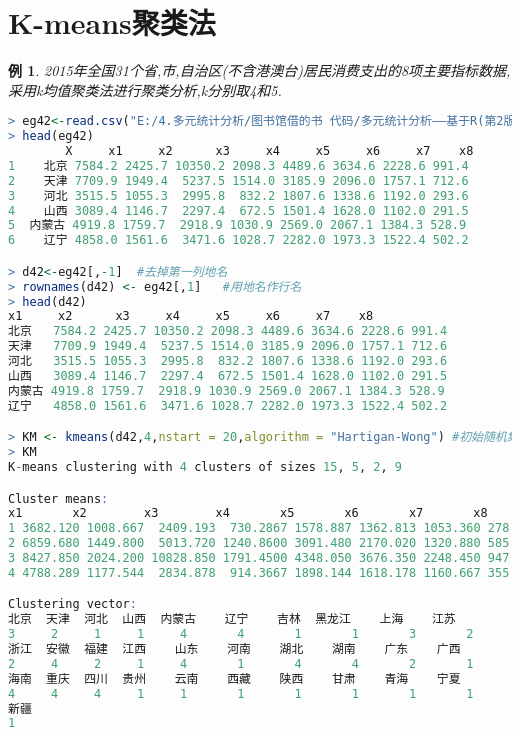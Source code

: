 \documentclass[11pt,a4paper,oneside]{book}
\newtheorem{e}{例}
\begin{document}
\section{K-means聚类法}
\begin{e}
2015年全国31个省,市,自治区(不含港澳台)居民消费支出的8项主要指标数据,采用k均值聚类法进行聚类分析,k分别取4和5.
\end{e}
\begin{lstlisting}[language=r]
> eg42<-read.csv("E:/4.多元统计分析/图书馆借的书 代码/多元统计分析——基于R(第2版) R-data/eg4.2.csv")
> head(eg42)
        X     x1     x2      x3     x4     x5     x6     x7    x8
1    北京 7584.2 2425.7 10350.2 2098.3 4489.6 3634.6 2228.6 991.4
2    天津 7709.9 1949.4  5237.5 1514.0 3185.9 2096.0 1757.1 712.6
3    河北 3515.5 1055.3  2995.8  832.2 1807.6 1338.6 1192.0 293.6
4    山西 3089.4 1146.7  2297.4  672.5 1501.4 1628.0 1102.0 291.5
5  内蒙古 4919.8 1759.7  2918.9 1030.9 2569.0 2067.1 1384.3 528.9
6    辽宁 4858.0 1561.6  3471.6 1028.7 2282.0 1973.3 1522.4 502.2

> d42<-eg42[,-1]  #去掉第一列地名
> rownames(d42) <- eg42[,1]   #用地名作行名
> head(d42)
x1     x2      x3     x4     x5     x6     x7    x8
北京   7584.2 2425.7 10350.2 2098.3 4489.6 3634.6 2228.6 991.4
天津   7709.9 1949.4  5237.5 1514.0 3185.9 2096.0 1757.1 712.6
河北   3515.5 1055.3  2995.8  832.2 1807.6 1338.6 1192.0 293.6
山西   3089.4 1146.7  2297.4  672.5 1501.4 1628.0 1102.0 291.5
内蒙古 4919.8 1759.7  2918.9 1030.9 2569.0 2067.1 1384.3 528.9
辽宁   4858.0 1561.6  3471.6 1028.7 2282.0 1973.3 1522.4 502.2

> KM <- kmeans(d42,4,nstart = 20,algorithm = "Hartigan-Wong") #初始随机集合的个数为20,算法为"Hartigan-Wong"(默认)
> KM
K-means clustering with 4 clusters of sizes 15, 5, 2, 9

Cluster means:
x1       x2        x3        x4       x5       x6       x7       x8
1 3682.120 1008.667  2409.193  730.2867 1578.887 1362.813 1053.360 278.8733
2 6859.680 1449.800  5013.720 1240.8600 3091.480 2170.020 1320.880 585.7200
3 8427.850 2024.200 10828.850 1791.4500 4348.050 3676.350 2248.450 947.8500
4 4788.289 1177.544  2834.878  914.3667 1898.144 1618.178 1160.667 355.4667

Clustering vector:
北京  天津  河北  山西  内蒙古    辽宁    吉林  黑龙江    上海    江苏 
3     2     1     1     4       4       1       1       3       2 
浙江  安徽  福建  江西    山东    河南    湖北    湖南    广东    广西 
2     4     2     1     4       1       4       4       2       1 
海南  重庆  四川  贵州    云南    西藏    陕西    甘肃    青海    宁夏 
4     4     4     1     1       1       1       1       1       1 
新疆 
1 


\end{lstlisting}
\end{document}
